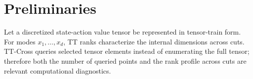 \section{Preliminaries}

Let a discretized state-action value tensor be represented in tensor-train form.
For modes \(x_1,\ldots,x_d\), TT ranks characterize the internal dimensions
across cuts. TT-Cross queries selected tensor elements instead of enumerating the
full tensor; therefore both the number of queried points and the rank profile
across cuts are relevant computational diagnostics.
